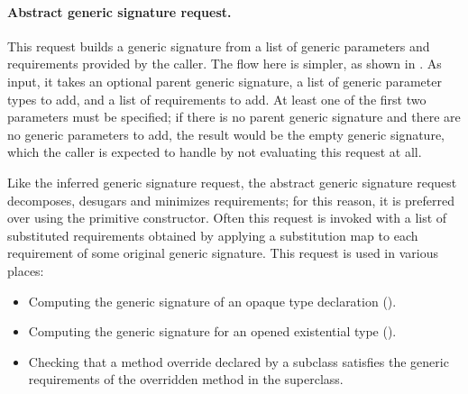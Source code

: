 \documentclass[../generics]{subfiles}
\begin{document}
\begin{figure}\label{abstract generic signature request figure}
\begin{center}
\end{center}
\end{figure}

\paragraph{Abstract generic signature request.}
This request builds a generic signature from a list of generic parameters and requirements provided by the caller. The flow here is simpler, as shown in . As input, it takes an optional parent generic signature, a list of generic parameter types to add, and a list of requirements to add. At least one of the first two parameters must be specified; if there is no parent generic signature and there are no generic parameters to add, the result would be the empty generic signature, which the caller is expected to handle by not evaluating this request at all.

Like the inferred generic signature request, the abstract generic signature request decomposes, desugars and minimizes requirements; for this reason, it is preferred over using the primitive constructor. Often this request is invoked with a list of substituted requirements obtained by applying a substitution map to each requirement of some original generic signature. This request is used in various places:
\begin{itemize}
\item Computing the generic signature of an opaque type declaration ().
\item Computing the generic signature for an opened existential type ().
\item Checking that a method override declared by a subclass satisfies the generic requirements of the overridden method in the superclass.
\end{itemize}
\end{document}
